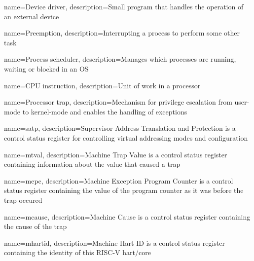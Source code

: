  {
    name=Device driver,
    description={Small program that handles the operation of an external device}
}

 {
    name=Preemption,
    description={Interrupting a process to perform some other task}
}

 {
    name=Process scheduler,
    description={Manages which processes are running, waiting or blocked in an OS}
}

 {
    name=CPU instruction,
    description={Unit of work in a processor}
}

 {
    name=Processor trap,
    description={Mechanism for privilege escalation from user-mode to kernel-mode and enables the handling of exceptions}
}

 {
    name=satp,
    description={Supervisor Address Translation and Protection is a control status register for controlling virtual addressing modes and configuration}
}

 {
    name=mtval,
    description={Machine Trap Value is a control status register containing information about the value that caused a trap}
}

 {
    name=mepc,
    description={Machine Exception Program Counter is a control status register containing the value of the program counter as it was before the trap occured}
}

 {
    name=mcause,
    description={Machine Cause is a control status register containing the cause of the trap}
}

 {
    name=mhartid,
    description={Machine Hart ID is a control status register containing the identity of this RISC-V hart/core}
}
